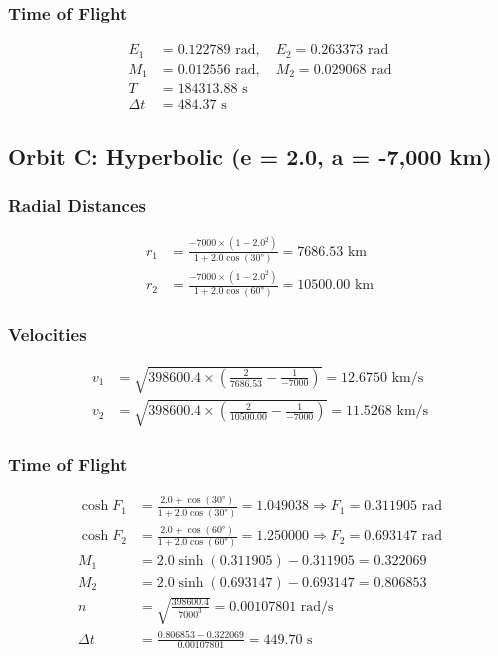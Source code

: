 \documentclass[12pt,a4paper]{article}
\begin{document}
\subsubsection{Time of Flight}
\begin{align}
E_1 &= 0.122789 \text{ rad}, \quad E_2 = 0.263373 \text{ rad} \\
M_1 &= 0.012556 \text{ rad}, \quad M_2 = 0.029068 \text{ rad} \\
T &= 184313.88 \text{ s} \\
\Delta t &= 484.37 \text{ s}
\end{align}

\subsection{Orbit C: Hyperbolic (e = 2.0, a = -7,000 km)}

\subsubsection{Radial Distances}
\begin{align}
r_1 &= \frac{-7000 \times (1-2.0^2)}{1+2.0\cos(30°)} = 7686.53 \text{ km} \\
r_2 &= \frac{-7000 \times (1-2.0^2)}{1+2.0\cos(60°)} = 10500.00 \text{ km}
\end{align}

\subsubsection{Velocities}
\begin{align}
v_1 &= \sqrt{398600.4 \times \left(\frac{2}{7686.53} - \frac{1}{-7000}\right)} = 12.6750 \text{ km/s} \\
v_2 &= \sqrt{398600.4 \times \left(\frac{2}{10500.00} - \frac{1}{-7000}\right)} = 11.5268 \text{ km/s}
\end{align}

\subsubsection{Time of Flight}
\begin{align}
\cosh F_1 &= \frac{2.0 + \cos(30°)}{1 + 2.0\cos(30°)} = 1.049038 \Rightarrow F_1 = 0.311905 \text{ rad} \\
\cosh F_2 &= \frac{2.0 + \cos(60°)}{1 + 2.0\cos(60°)} = 1.250000 \Rightarrow F_2 = 0.693147 \text{ rad} \\
M_1 &= 2.0\sinh(0.311905) - 0.311905 = 0.322069 \\
M_2 &= 2.0\sinh(0.693147) - 0.693147 = 0.806853 \\
n &= \sqrt{\frac{398600.4}{7000^3}} = 0.00107801 \text{ rad/s} \\
\Delta t &= \frac{0.806853 - 0.322069}{0.00107801} = 449.70 \text{ s}
\end{align}
\end{document}
